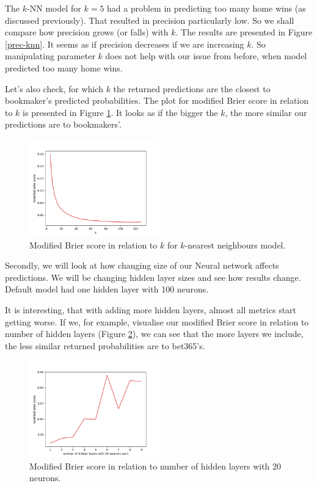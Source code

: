 \documentclass[conference]{IEEEtran}
\begin{document}
The $k$-NN model for $k=5$ had a problem in predicting too many home wins (as discussed 
previously). That resulted in precision particularly low. So we shall compare how precision
grows (or falls) with $k$. The results are presented in Figure \ref{prec-knn}. It seems as if
precision decreases if we are increasing $k$. So manipulating parameter $k$ does not help with
our issue from before, when model predicted too many home wins.

Let's also check, for which $k$ the returned predictions are the closest to bookmaker's 
predicted probabilities. The plot for modified Brier score in relation to $k$ is presented in Figure \ref{mbs-knn}. It looks as if the bigger the $k$, the more similar our predictions are to bookmakers'.

\begin{figure}[!ht]
\includegraphics[width=0.5\textwidth]{mbs_k_knn.png}
\caption{Modified Brier score in relation to $k$ for $k$-nearest neighbours model.}
\label{mbs-knn}
\end{figure}

Secondly, we will look at how changing size of our Neural network affects predictions.
We will be changing hidden layer sizes and see how results change. Default model had one
hidden layer with 100 neurons.

It is interesting, that with adding more hidden layers, almost all metrics start getting worse.
If we, for example, visualise our modified Brier score in relation to number of hidden layers 
(Figure \ref{mbs-mlp}), we can see that the more layers we include, the less similar
returned probabilities are to bet365's.

\begin{figure}[!ht]
\includegraphics[width=0.5\textwidth]{mbs_layers_mlp.png}
\caption{Modified Brier score in relation to number of hidden layers with 20 neurons.}
\label{mbs-mlp}
\end{figure}
\end{document}
